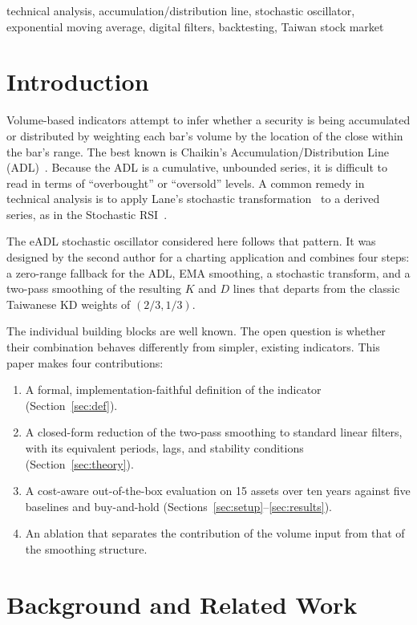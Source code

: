 \documentclass[conference]{IEEEtran}
\begin{document}
\begin{IEEEkeywords}
technical analysis, accumulation/distribution line, stochastic oscillator, exponential moving average, digital filters, backtesting, Taiwan stock market
\end{IEEEkeywords}

\section{Introduction}
Volume-based indicators attempt to infer whether a security is being accumulated or distributed by weighting each bar's volume by the location of the close within the bar's range. The best known is Chaikin's Accumulation/Distribution Line (ADL)~\cite{stockcharts_adl,murphy1999}. Because the ADL is a cumulative, unbounded series, it is difficult to read in terms of ``overbought'' or ``oversold'' levels. A common remedy in technical analysis is to apply Lane's stochastic transformation~\cite{lane1984} to a derived series, as in the Stochastic RSI~\cite{chande1994}.

The eADL stochastic oscillator considered here follows that pattern. It was designed by the second author for a charting application and combines four steps: a zero-range fallback for the ADL, EMA smoothing, a stochastic transform, and a two-pass smoothing of the resulting $K$ and $D$ lines that departs from the classic Taiwanese KD weights of $(2/3, 1/3)$.

The individual building blocks are well known. The open question is whether their combination behaves differently from simpler, existing indicators. This paper makes four contributions:
\begin{enumerate}
\item A formal, implementation-faithful definition of the indicator (Section~\ref{sec:def}).
\item A closed-form reduction of the two-pass smoothing to standard linear filters, with its equivalent periods, lags, and stability conditions (Section~\ref{sec:theory}).
\item A cost-aware out-of-the-box evaluation on 15 assets over ten years against five baselines and buy-and-hold (Sections~\ref{sec:setup}--\ref{sec:results}).
\item An ablation that separates the contribution of the volume input from that of the smoothing structure.
\end{enumerate}

\section{Background and Related Work}
\end{document}
